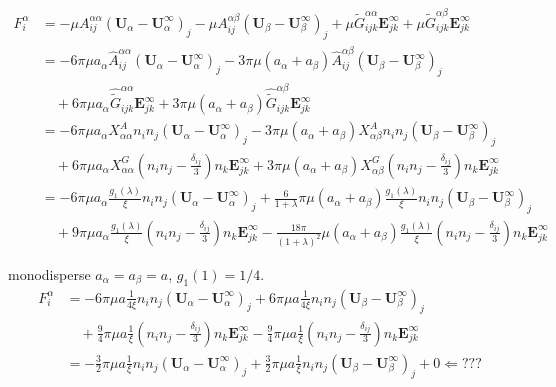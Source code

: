 \documentclass[12pt]{article}
\begin{document}
\begin{align*}
F^{\alpha}_i
&= 
- \mu A^{\alpha\alpha}_{ij}
(\bm{U}_{\alpha}-\bm{U}_{\alpha}^{\infty})_j
- \mu A^{\alpha\beta}_{ij}
(\bm{U}_{\beta}-\bm{U}_{\beta}^{\infty})_j
+ \mu \tilde{G}^{\alpha\alpha}_{ijk} \bm{E}^{\infty}_{jk}
+ \mu \tilde{G}^{\alpha\beta}_{ijk} \bm{E}^{\infty}_{jk} \\
&=
- 6 \pi\mu a_{\alpha} \hat{A}^{\alpha\alpha}_{ij}
(\bm{U}_{\alpha}-\bm{U}_{\alpha}^{\infty})_j
- 3 \pi\mu (a_{\alpha}+a_{\beta})\hat{A}^{\alpha\beta}_{ij}
(\bm{U}_{\beta}-\bm{U}_{\beta}^{\infty})_j \\
&\quad
+ 6 \pi\mu a_{\alpha} \hat{\tilde{G}}^{\alpha\alpha}_{ijk} \bm{E}^{\infty}_{jk}
+ 3 \pi\mu (a_{\alpha}+a_{\beta}) \hat{\tilde{G}}^{\alpha\beta}_{ijk} \bm{E}^{\infty}_{jk} \\
&=
- 6 \pi\mu a_{\alpha} X_{\alpha\alpha}^{A} n_i n_j
(\bm{U}_{\alpha}-\bm{U}_{\alpha}^{\infty})_j
- 3 \pi\mu (a_{\alpha}+a_{\beta}) X_{\alpha\beta}^{A} n_i n_j
(\bm{U}_{\beta}-\bm{U}_{\beta}^{\infty})_j \\
&\quad
+ 6 \pi\mu a_{\alpha} X_{\alpha\alpha}^{G} 
\left(n_i n_j - \frac{\delta_{ij}}{3}  \right)n_k \bm{E}^{\infty}_{jk}
+ 3 \pi\mu (a_{\alpha}+a_{\beta}) 
X_{\alpha\beta}^{G} \left(n_i n_j - \frac{\delta_{ij}}{3} \right)n_k \bm{E}^{\infty}_{jk} \\
&=
- 6 \pi\mu a_{\alpha} \frac{g_1(\lambda)}{\xi} n_i n_j
(\bm{U}_{\alpha}-\bm{U}_{\alpha}^{\infty})_j
+ \frac{6}{1+\lambda} \pi\mu (a_{\alpha}+a_{\beta})\frac{g_1(\lambda)}{\xi} n_i n_j
(\bm{U}_{\beta}-\bm{U}_{\beta}^{\infty})_j 
\\
&\quad
+ 9 \pi \mu a_{\alpha} \frac{g_1(\lambda)}{\xi} 
\left(n_i n_j - \frac{\delta_{ij}}{3} \right)n_k \bm{E}^{\infty}_{jk}
-  
\frac{18 \pi}{(1+\lambda)^2} 
\mu (a_{\alpha}+ a_{\beta})
\frac{g_1(\lambda)}{\xi} 
\left(n_i n_j - \frac{\delta_{ij}}{3} \right) n_k \bm{E}^{\infty}_{jk} 
\end{align*}

monodisperse $a_\alpha = a_{\beta}=a$, $g_1(1)=1/4$.
\begin{align*}
 F^{\alpha}_i
&= 
- 6 \pi\mu a \frac{1}{4\xi} n_i n_j
(\bm{U}_{\alpha}-\bm{U}_{\alpha}^{\infty})_j
+ 6 \pi\mu a\frac{1}{4\xi} n_i n_j
(\bm{U}_{\beta}-\bm{U}_{\beta}^{\infty})_j 
\\
&\quad
+ \frac{9}{4} \pi \mu a \frac{1}{\xi} 
\left(n_i n_j - \frac{\delta_{ij}}{3} \right) n_k \bm{E}^{\infty}_{jk}
-  
\frac{9}{4} \pi \mu a
\frac{1}{\xi} 
\left(n_i n_j - \frac{\delta_{ij}}{3} \right)n_k \bm{E}^{\infty}_{jk} \\
&= 
- \frac{3}{2} \pi\mu a \frac{1}{\xi} n_i n_j
(\bm{U}_{\alpha}-\bm{U}_{\alpha}^{\infty})_j
+ \frac{3}{2} \pi\mu a\frac{1}{\xi} n_i n_j
(\bm{U}_{\beta}-\bm{U}_{\beta}^{\infty})_j 
+ 0 \Leftarrow ???
\end{align*}
\end{document}
